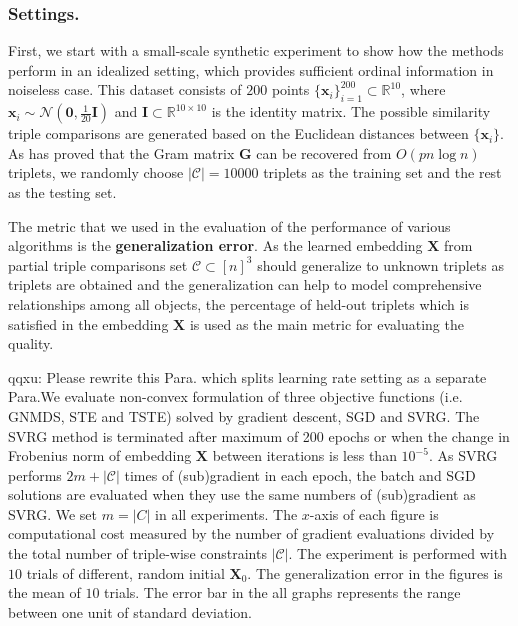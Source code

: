 \documentclass[letterpaper]{article}
\newcommand{\qqxu}[1]{\textcolor[rgb]{0.00,1.00,0.00}{#1}}
\begin{document}
		\subsubsection{Settings.}
		First, we start with a small-scale synthetic experiment to show how the methods perform in an idealized setting, which provides sufficient ordinal information in noiseless case. This dataset consists of $200$ points $\{\mathbf{x}_i\}_{i=1}^{200}\subset\mathbb{R}^{10}$, where $\mathbf{x}_i\sim\mathcal{N}(\mathbf{0}, \frac{1}{20}\mathbf{I})$ and $\mathbf{I}\subset\mathbb{R}^{10\times 10}$ is the identity matrix. The possible similarity triple comparisons are generated based on the Euclidean distances between $\{\mathbf{x}_i\}$. As \cite{2016arXiv160607081J} has proved that the Gram matrix $\mathbf{G}$ can be recovered from $O(pn\log n)$ triplets, we randomly choose $|\mathcal{C}|=10000$ triplets as the training set and the rest as the testing set.

		The metric that we used in the evaluation of the performance of various algorithms is the \textbf{generalization error}. As the learned embedding $\mathbf{X}$ from partial triple comparisons set $\mathcal{C}\subset[n]^3$ should generalize to unknown triplets as triplets are obtained and the generalization can help to model comprehensive relationships among all objects, the percentage of held-out triplets which is satisfied in the embedding $\mathbf{X}$ is used as the main metric for evaluating the quality.

		\qqxu{qqxu: Please rewrite this Para. which splits learning rate setting as a separate Para.}We evaluate non-convex formulation of three objective functions (i.e. GNMDS, STE and TSTE) solved by gradient descent, SGD and SVRG.
		The SVRG method is terminated after maximum of 200 epochs or when the change in Frobenius norm of embedding $\mathbf{X}$ between iterations is less than $10^{-5}$. As SVRG performs $2m+|\mathcal{C}|$ times of (sub)gradient in each epoch, the batch and SGD solutions are evaluated when they use the same numbers of (sub)gradient as SVRG. We set $m=|C|$ in all experiments. The $x$-axis of each figure is computational cost measured by the number of gradient evaluations divided by the total number of triple-wise constraints $|\mathcal{C}|$. The experiment is performed with $10$ trials of different, random initial $\mathbf{X}_0$. The generalization error in the figures is the mean of $10$ trials. The error bar in the all graphs represents the range between one unit of standard deviation.
\end{document}

